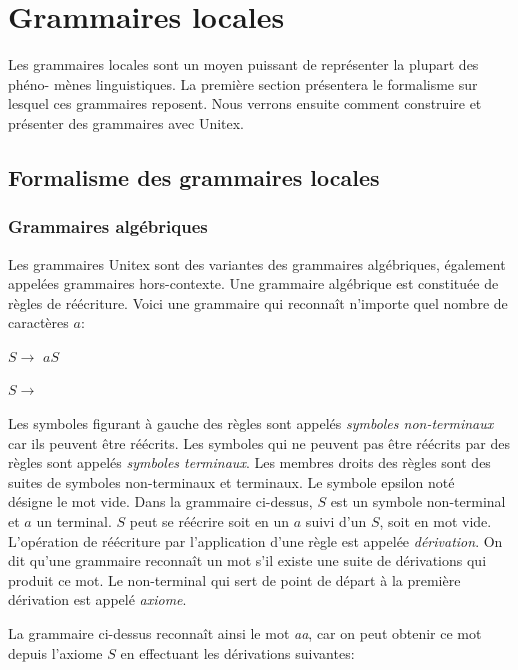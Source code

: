 \chapter{Grammaires locales}
\label{chap-grammars}

Les grammaires locales sont un moyen puissant de représenter la plupart des phéno-
mènes linguistiques. La première section présentera le formalisme sur lesquel ces
grammaires reposent. Nous verrons ensuite comment construire et présenter des grammaires
avec Unitex.


\section{Formalisme des grammaires locales}

\subsection{Grammaires algébriques}
Les grammaires Unitex sont des variantes des grammaires algébriques, également appelées
grammaires hors-contexte. Une grammaire algébrique est constituée de
règles de réécriture. Voici une grammaire qui reconnaît n’importe quel nombre de caractères $a$:

\bigskip $S \rightarrow$ $aS$

$S \rightarrow$ \E

\bigskip
\noindent Les symboles figurant à gauche des règles sont appelés \textit{symboles
 non-terminaux}                                                                                       car ils peuvent être réécrits. Les symboles qui ne peuvent pas être réécrits par des règles sont
 appelés \textit{symboles terminaux}. Les membres droits des règles
sont des suites de symboles non-terminaux et terminaux. Le symbole epsilon noté \E ~
désigne le mot vide. Dans la grammaire ci-dessus, $S$ est un symbole non-terminal et
$a$ un terminal. $S$ peut se réécrire soit en un $a$ suivi d’un $S$,
soit en mot vide. L’opération de réécriture par l’application d’une règle est appelée
\textit{dérivation}. On dit qu’une grammaire reconnaît un mot s’il existe
une suite de dérivations qui produit ce mot. Le non-terminal qui sert de point de départ
à la première dérivation est appelé \textit{axiome}.


\bigskip
\noindent La grammaire ci-dessus reconnaît ainsi le mot \textit{aa}, car on peut obtenir ce
mot depuis l’axiome $S$ en effectuant les dérivations suivantes:

